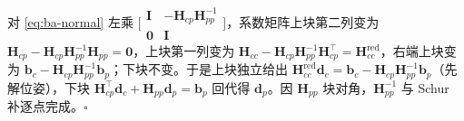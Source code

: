 \begin{derivation}
对 \cref{eq:ba-normal} 左乘 $\big[\begin{smallmatrix}\mathbf{I}&-\mathbf{H}_{cp}\mathbf{H}_{pp}^{-1}\\\mathbf{0}&\mathbf{I}\end{smallmatrix}\big]$，系数矩阵上块第二列变为 $\mathbf{H}_{cp}-\mathbf{H}_{cp}\mathbf{H}_{pp}^{-1}\mathbf{H}_{pp}=\mathbf{0}$，上块第一列变为 $\mathbf{H}_{cc}-\mathbf{H}_{cp}\mathbf{H}_{pp}^{-1}\mathbf{H}_{cp}^\top=\mathbf{H}_{cc}^{\text{red}}$，右端上块变为 $\mathbf{b}_c-\mathbf{H}_{cp}\mathbf{H}_{pp}^{-1}\mathbf{b}_p$；下块不变。于是上块独立给出 $\mathbf{H}_{cc}^{\text{red}}\mathbf{d}_c=\mathbf{b}_c-\mathbf{H}_{cp}\mathbf{H}_{pp}^{-1}\mathbf{b}_p$（先解位姿），下块 $\mathbf{H}_{cp}^\top\mathbf{d}_c+\mathbf{H}_{pp}\mathbf{d}_p=\mathbf{b}_p$ 回代得 $\mathbf{d}_p$。因 $\mathbf{H}_{pp}$ 块对角，$\mathbf{H}_{pp}^{-1}$ 与 Schur 补逐点完成。\hfill$\square$
\end{derivation}
